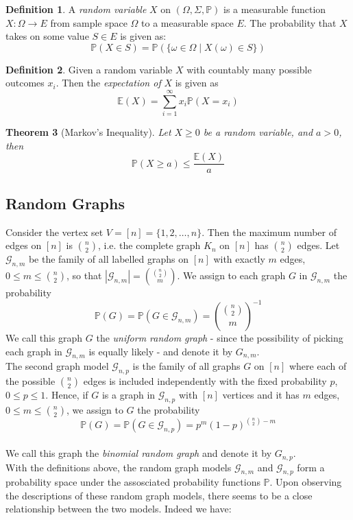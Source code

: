 \documentclass[12pt,oneside,reqno]{amsart}
\newtheorem{theorem}{Theorem}[section]
\theoremstyle{definition}
\newtheorem{definition}[theorem]{Definition}
\numberwithin{equation}{theorem}
\newcommand{\PP}{{\mathbb P}}%
\newcommand{\EE}{{\mathbb E}} %
\begin{document}
\begin{definition}
A \emph{random variable} $X$ on $(\Omega, \Sigma, \PP)$ is a measurable function $X : \Omega \longrightarrow E$ from sample space $\Omega$ to a measurable space $E$. The probability that $X$ takes on some value $S \in E$ is given as: 
$$
\PP(X \in S) = \PP(\{\omega \in \Omega \mid X(\omega) \in S\})
$$
\end{definition}

\begin{definition}
Given a random variable $X$ with countably many possible outcomes $x_i$. Then the \emph{expectation of} $X$ is given as
\[
\EE(X) = \sum_{i = 1}^{\infty}x_i \PP(X = x_i) 
\]
\end{definition}

\begin{theorem}[Markov's Inequality]\label{mi}
Let $X \geq 0$ be a random variable, and $a > 0$, then
\[
\PP(X\geq a) \leq \frac{\EE(X)}{a}
\]
\end{theorem}



\subsection{Random Graphs}

Consider the vertex set $V = [n] = \{1,2, \ldots, n\}$. Then the maximum number of edges on $[n]$ is $\binom{n}{2}$, i.e. the complete graph $K_n$ on $[n]$ has $\binom{n}{2}$ edges. Let $\mathscr{G}_{n,m}$ be the family of all labelled graphs on $[n]$ with exactly $m$ edges, $0 \leq m \leq \binom{n}{2}$, so that $|\mathscr{G}_{n,m}| = \binom{\binom{n}{2}}{m}$. We assign to each graph $G$ in $\mathscr{G}_{n,m}$ the probability
$$\mathbb{P}(G)=\mathbb{P}(G \in \mathscr{G}_{n,m})={\binom{\binom{n}{2}}{m}}^{-1}$$
\newline
We call this graph $G$ the \emph{uniform random graph} - since the possibility of picking each graph in $\mathscr{G}_{n,m}$ is equally likely - and denote it by $G_{n,m}$.
\newline 
\\
The second graph model $\mathscr{G}_{n,p}$ is the family of all graphs $G$ on $[n]$ where each of the possible $\binom{n}{2}$ edges is included independently with the fixed probability $p$, 
 $0 \leq p \leq 1$. Hence, if $G$ is a graph in $\mathscr{G}_{n,p}$ with $[n]$ vertices and it has $m$ edges, $0 \leq m \leq \binom{n}{2}$, we assign to $G$ the probability
$$\mathbb{P}(G)=\mathbb{P}(G \in \mathscr{G}_{n,p})=p^m(1-p)^{\binom{n}{2}-m}$$
\\
We call this graph the \emph{binomial random graph} and denote it by $G_{n,p}$.
\newline 
\\
With the definitions above, the random graph models $\mathscr{G}_{n,m}$  and $\mathscr{G}_{n,p}$ form a probability space under the assosciated probability functions $\PP$.
Upon observing the descriptions of these random graph models, there seems to be a close relationship between the two models. Indeed we have: 
\end{document}
